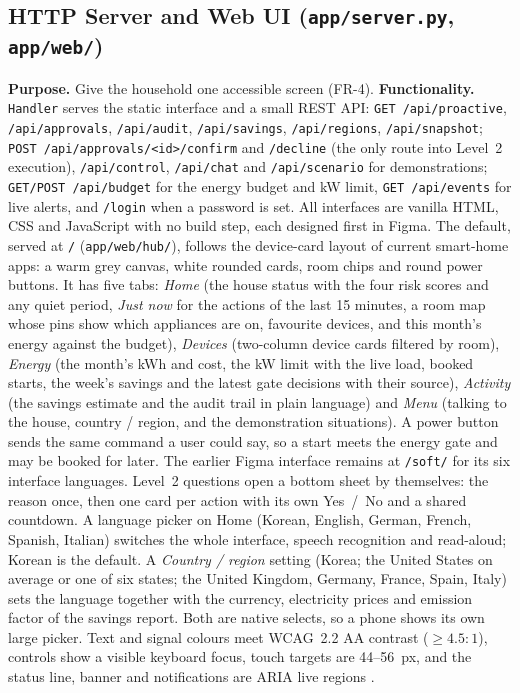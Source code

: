\documentclass[conference]{IEEEtran}
\begin{document}
\subsection{HTTP Server and Web UI (\texttt{app/server.py}, \texttt{app/web/})}
\textbf{Purpose.} Give the household one accessible screen (FR-4).
\textbf{Functionality.} \texttt{Handler} serves the static interface and a small REST API: \texttt{GET /api/proactive}, \texttt{/api/approvals}, \texttt{/api/audit}, \texttt{/api/savings}, \texttt{/api/regions}, \texttt{/api/snapshot}; \texttt{POST /api/approvals/<id>/confirm} and \texttt{/decline} (the only route into Level~2 execution), \texttt{/api/control}, \texttt{/api/chat} and \texttt{/api/scenario} for demonstrations; \texttt{GET/POST /api/budget} for the energy budget and kW limit, \texttt{GET /api/events} for live alerts, and \texttt{/login} when a password is set. All interfaces are vanilla HTML, CSS and JavaScript with no build step, each designed first in Figma. The default, served at \texttt{/} (\texttt{app/web/hub/}), follows the device-card layout of current smart-home apps: a warm grey canvas, white rounded cards, room chips and round power buttons. It has five tabs: \emph{Home} (the house status with the four risk scores and any quiet period, \emph{Just now} for the actions of the last 15 minutes, a room map whose pins show which appliances are on, favourite devices, and this month's energy against the budget), \emph{Devices} (two-column device cards filtered by room), \emph{Energy} (the month's kWh and cost, the kW limit with the live load, booked starts, the week's savings and the latest gate decisions with their source), \emph{Activity} (the savings estimate and the audit trail in plain language) and \emph{Menu} (talking to the house, country / region, and the demonstration situations). A power button sends the same command a user could say, so a start meets the energy gate and may be booked for later. The earlier Figma interface remains at \texttt{/soft/} for its six interface languages. Level~2 questions open a bottom sheet by themselves: the reason once, then one card per action with its own Yes~/~No and a shared countdown. A language picker on Home (Korean, English, German, French, Spanish, Italian) switches the whole interface, speech recognition and read-aloud; Korean is the default. A \emph{Country / region} setting (Korea; the United States on average or one of six states; the United Kingdom, Germany, France, Spain, Italy) sets the language together with the currency, electricity prices and emission factor of the savings report. Both are native selects, so a phone shows its own large picker. Text and signal colours meet WCAG~2.2 AA contrast ($\geq 4.5{:}1$), controls show a visible keyboard focus, touch targets are 44--56~px, and the status line, banner and notifications are ARIA live regions \cite{wcag2023}.
\end{document}
